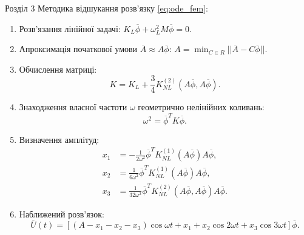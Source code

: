 \documentclass[8pt]{beamer}
\numberwithin{figure}{section}
\numberwithin{equation}{section}
\numberwithin{table}{section}
\begin{document}
\begin{frame}{Розділ 3}
Методика відшукання розв'язку \eqref{eq:ode_fem}:
\begin{enumerate}
	\item Розв’язання лінійної задачі:
	$K_L\overline{\phi}+\omega_L^2 M \overline{\phi}=0$. 
	\item Апроксимація початкової умови $\overline{A}\approx A\overline{\phi}$: 
	$\displaystyle A=\min_{C \in R} ||\overline{A}-C\overline{\phi}||$.\\
	\item Обчислення матриці:
	\begin{equation}\label{eq:Kmatrix}
	K = K_L + \frac34 K_{NL}^{(2)}\left( A\overline{\phi},A\overline{\phi} \right). 
	\end{equation}
	\item Знаходження власної частоти $\omega$ геометрично нелінійних коливань:
	\begin{equation}\label{eq:omega_nonlin}
	\omega^2=\overline{\phi}^T K \overline{\phi}.
	\end{equation}
	\item Визначення амплітуд:
	 \begin{equation}
 \begin{aligned}
x_1&=-\frac{1}{2\omega ^2}\overline{\phi}^T K_{NL}^{(1)}\left( A\overline{\phi} \right) A\overline{\phi},\\
x_2&=\frac{1}{6\omega ^2}\overline{\phi}^T K_{NL}^{(1)}\left( A\overline{\phi} \right) A\overline{\phi},\\
x_3&=\frac{1}{32\omega ^2}\overline{\phi}^T K_{NL}^{(2)}\left( A\overline{\phi},A\overline{\phi} \right) A\overline{\phi}.
\end{aligned}
	 \end{equation}
	\item Наближений розв'язок:
	\begin{equation}
	\overline{U}\left(t\right)=\left[\left(A-x_1-x_2-x_3\right)\cos \omega t + x_1+x_2\cos 2 \omega t+x_3\cos 3 \omega t\right]\overline{\phi}.
	\end{equation}
\end{enumerate}
\end{frame}
\end{document}
